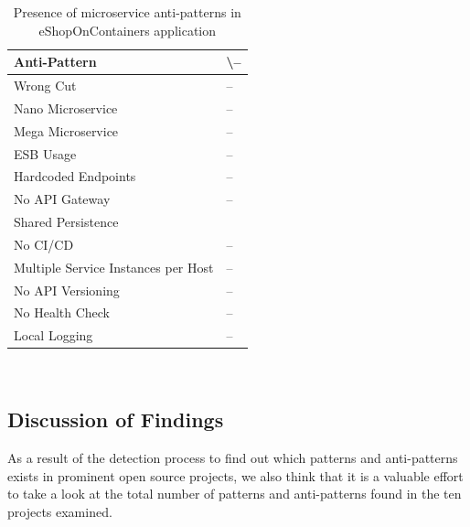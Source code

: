 \documentclass[11pt,a4paper,twocolumn]{article}
\newcommand{\cmark}{\ding{51}}%
\begin{document}
\begin{table}[H]
\centering 
    \begin{tabular}{ 
  | >{\centering\arraybackslash} m{15.5em} 
  | >{\centering\arraybackslash} m{2.2em} | }
    \hline
    \rowcolor{bluepoli!40}
    \textbf{Anti-Pattern} & \cmark \textbackslash – \T\B \\
    \hline \hline
    Wrong Cut & – \T\B\\
    \hline
    \rowcolor{bluepoli!10}
    Nano Microservice & – \T\B \\
    \hline
    Mega Microservice & – \T\B \\
    \hline
    \rowcolor{bluepoli!10}
    ESB Usage & – \T\B \\
    \hline
    Hardcoded Endpoints & – \T\B \\
    \hline
    \rowcolor{bluepoli!10}
    No API Gateway & – \T\B \\
    \hline
    Shared Persistence & \cmark \T\B \\
    \hline
    \rowcolor{bluepoli!10}
    No CI/CD & – \T\B \\
    \hline
    Multiple Service Instances per Host & – \T\B \\
    \hline
    \rowcolor{bluepoli!10}
    No API Versioning & – \T\B \\
    \hline
    No Health Check & – \T\B \\
    \hline
    \rowcolor{bluepoli!10}
    Local Logging & – \T\B \\
    \hline
    \end{tabular}
    \\[10pt]
    \caption{Presence of microservice anti-patterns in eShopOnContainers application}
    \label{table:eshop_2}
\end{table}

\subsection{Discussion of Findings}
\label{subsec:discussion}

As a result of the detection process to find out which patterns and anti-patterns exists in prominent open source projects, we also think that it is a valuable effort to take a look at the total number of patterns and anti-patterns found in the ten projects examined.
\end{document}
